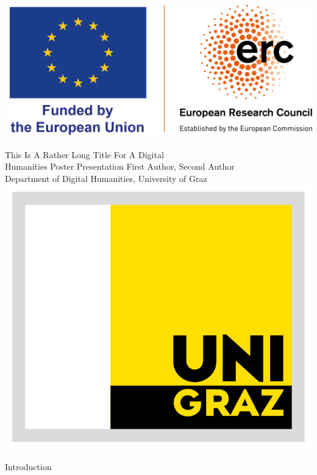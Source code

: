 \documentclass[a0paper,portrait]{baposter}
\begin{document}
\begin{poster}
{\begin{minipage}{.125\linewidth}
	\includegraphics[width=\linewidth]{logo_erc-flag_eu.png}
\end{minipage}}
{
	\textsf{This Is A Rather Long Title For A Digital\\ 
	Humanities Poster Presentation}
}
{
\sf\vspace{.2em}
First Author, Second Author\\
\vspace{.2em}
{\small Department of Digital Humanities, University of Graz}
}
{
\includegraphics[width=.125\linewidth]{unigraz_logo.png} %
}
%
\begin{posterbox}[name=introduction,column=0,row=0, span=3]{Introduction}
	\small
    \lipsum*[19]
	\vspace{1em}


\end{posterbox}
\end{poster}
\end{document}
